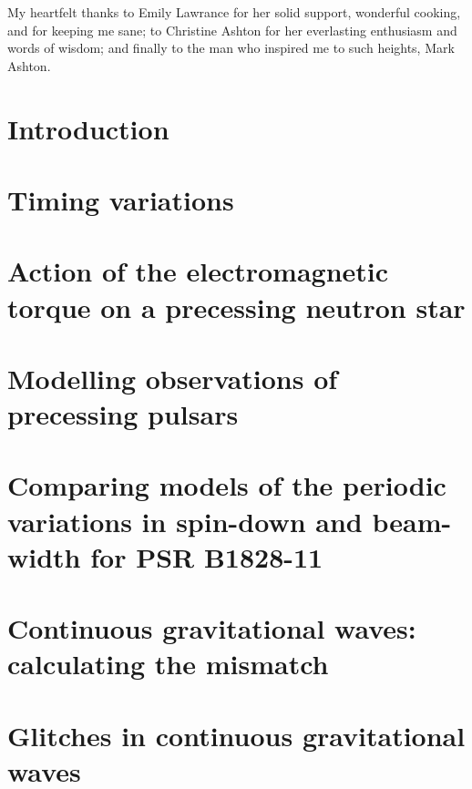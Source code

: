 \documentclass[twoside, 11pt]{thesis}
\begin{document}
{My heartfelt thanks to Emily Lawrance for her solid support, wonderful cooking,
and for keeping me sane; to Christine Ashton for her everlasting
enthusiasm and words of wisdom; and finally to the man who inspired me to such
heights, Mark Ashton.

}


\mainmatter

\chapter{Introduction}
\label{sec: neutron star physics}


\chapter{Timing variations}
\label{sec: timing variations}


\chapter{Action of the electromagnetic torque on a precessing neutron star}
\label{sec: rotating frame}


\chapter{Modelling observations of precessing pulsars}
\label{sec: inertial frame}


\chapter{Comparing models of the periodic variations in spin-down
and beam-width for PSR B1828-11}
\label{sec: testing models}


\chapter{Continuous gravitational waves: calculating the mismatch}
\label{sec: intro to cgw}


\chapter{Glitches in continuous gravitational waves}
\label{sec: glitches in cgw}

\end{document}
